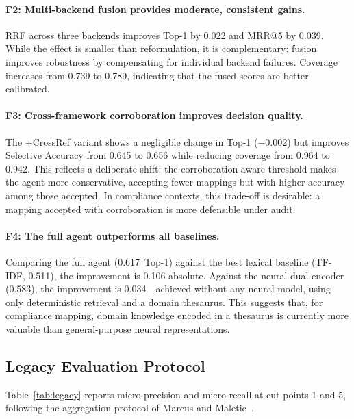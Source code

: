 \documentclass{sn-jnl}
\begin{document}
\paragraph{F2: Multi-backend fusion provides moderate, consistent gains.}
RRF across three backends improves Top-1 by 0.022 and MRR@5 by 0.039.
While the effect is smaller than reformulation, it is complementary: fusion improves robustness by compensating for individual backend failures.
Coverage increases from 0.739 to 0.789, indicating that the fused scores are better calibrated.

\paragraph{F3: Cross-framework corroboration improves decision quality.}
The +CrossRef variant shows a negligible change in Top-1 ($-$0.002) but improves Selective Accuracy from 0.645 to 0.656 while reducing coverage from 0.964 to 0.942.
This reflects a deliberate shift: the corroboration-aware threshold makes the agent more conservative, accepting fewer mappings but with higher accuracy among those accepted.
In compliance contexts, this trade-off is desirable: a mapping accepted with corroboration is more defensible under audit.

\paragraph{F4: The full agent outperforms all baselines.}
Comparing the full agent (0.617~Top-1) against the best lexical baseline (TF-IDF, 0.511), the improvement is 0.106 absolute.
Against the neural dual-encoder (0.583), the improvement is 0.034---achieved without any neural model, using only deterministic retrieval and a domain thesaurus.
This suggests that, for compliance mapping, domain knowledge encoded in a thesaurus is currently more valuable than general-purpose neural representations.


\subsection{Legacy Evaluation Protocol}

Table~\ref{tab:legacy} reports micro-precision and micro-recall at cut points 1 and 5, following the aggregation protocol of Marcus and Maletic~\cite{MarcusMaletic2003}.
\end{document}
